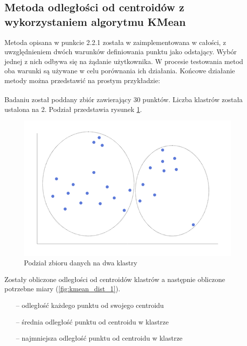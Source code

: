 \documentclass[eng,printmode]{mgr}
\begin{document}
\subsection{Metoda odległości od centroidów z wykorzystaniem algorytmu KMean}
Metoda opisana w punkcie 2.2.1 została w zaimplementowana w całości, z uwzględnieniem dwóch warunków definiowania punktu jako odstający. Wybór jednej z nich odbywa się na żądanie użytkownika. W procesie testowania metod oba warunki są używane w celu porównania ich działania. Końcowe działanie metody można przedstawić na prostym przykładzie:
\\\\
Badaniu został poddany zbiór zawierający 30 punktów. Liczba klastrów została ustalona na 2. Podział przedstawia rysunek \ref{fig:kmean_dist}.
\begin{figure}[H]
  \begin{center}
    \includegraphics[scale=0.5]{kmean_dist}
        \caption{Podział zbioru danych na dwa klastry}
        \label{fig:kmean_dist}
  \end{center}
\end{figure}
Zostały obliczone odległości od centroidów klastrów a następnie obliczone potrzebne miary (\ref{fig:kmean_dist_1}).
\begin{itemize}
  \item[--] odległość każdego punktu od swojego centroidu
  \item[--] średnia odległość punktu od centroidu w klastrze
  \item[--] najmniejsza odległość punktu od centroidu w klastrze
\end{itemize}
\end{document}
